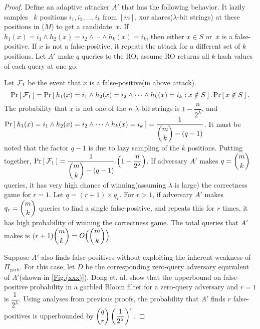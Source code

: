 \begin{proof}%
Define an adaptive attacker $A'$ that has the following behavior. It lazily samples ~$k$ positions $i_1,i_2,\ldots,i_k$ from $[m]$, xor shares($\lambda$-bit strings) at these positions in ($M$) to get a candidate~$x$.  If $h_{1}(x)=i_1 \wedge h_2(x)=i_2 \wedge \cdots \wedge h_k(x) = i_k$, then either $x \in S$ or~$x$ is a false-positive. If $x$ is not a false-positive, it repeats the attack for a different set of $k$ positions. Let $A'$ make $q$ queries to the RO; assume RO returns all $k$ hash values of each query at one go.

Let ${\cal F}_1$ be the event that $x$ is a false-positive(in above attack).
 $$\Pr\left[\: {\cal F}_1 \:\right] = \Pr\left[\: h_{1}(x)=i_1 \wedge h_2(x)=i_2 \wedge \cdots \wedge h_k(x) = i_k : x \notin S \:\right].\Pr\left[\: x \notin S \:\right].$$
 The probability that $x$ is not one of the $n$ $\lambda$-bit strings is $1-\dfrac{n}{2^\lambda}$, and $ \Pr\left[\: h_{1}(x)=i_1 \wedge h_2(x)=i_2 \wedge \cdots \wedge\\ h_k(x) = i_k \:\right] = \dfrac{1}{\dbinom{m}{k}-(q-1)}$. It must be noted that the factor $q-1$ is due to lazy sampling of the $k$ positions. Putting together, $\Pr\left[\: {\cal F}_1 \:\right] =  \dfrac{1}{\dbinom{m}{k}-(q-1)} . \Big(1-\dfrac{n}{2^\lambda}\Big)$.  If adversary $A'$ makes $q = \dbinom{m}{k}$ queries, it has very high chance of winning(assuming $\lambda$ is large) the correctness game for $r=1$.  Let $q = (r+1) \times q_r$. For $r > 1$, if adversary $A'$ makes $q_r = \dbinom{m}{k}$ queries to find a single false-positive, and repeats this for $r$ times, it has high probability of winning the correctness game. The total queries that $A'$ makes is $(r+1)\dbinom{m}{k} = O\Big(\dbinom{m}{k}\Big)$.

Suppose $A'$ also finds false-positives without exploiting the inherent weakness of $\Pi_{\mathrm{garb}}$. For this case, let $D$ be the corresponding  zero-query adversary equivalent of $A'$(shown in \ref{Fig.(xxx)}). Dong et. al. \cite{dong2013private} show that the upperbound on false-positive probability in a garbled Bloom filter for a zero-query adversary and $r=1$ is $\dfrac{1}{2^\lambda}$.   Using analyses from previous proofs, the probability that $A'$ finds $r$ false-positives is upperbounded by  $\dbinom{q}{r}\left(\dfrac{1}{2^\lambda}\right)^r$. 


\end{proof}
